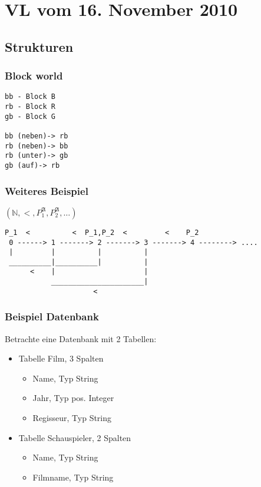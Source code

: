 


\section{VL vom 16. November 2010}

\subsection{Strukturen}
\subsubsection{Block world}

\begin{verbatim}
bb - Block B
rb - Block R
gb - Block G

bb (neben)-> rb
rb (neben)-> bb
rb (unter)-> gb
gb (auf)-> rb
\end{verbatim}

\subsubsection{Weiteres Beispiel}
$(\mathbb{N}, <, P_1^{\mathfrak{A}}, P_2^{\mathfrak{A}}, \dots)$
\begin{verbatim}
P_1  <          <  P_1,P_2  <         <    P_2
 0 ------> 1 -------> 2 -------> 3 -------> 4 --------> ....
 |         |          |          |
 __________|__________|          |
      <    |                     |
           ______________________|
                     <
\end{verbatim}

\subsubsection{Beispiel Datenbank}
Betrachte eine Datenbank mit 2 Tabellen:
\begin{itemize}
\item Tabelle Film, 3 Spalten
\begin{itemize}
\item Name, Typ String
\item Jahr, Typ pos. Integer
\item Regisseur, Typ String
\end{itemize}
\item Tabelle Schauspieler, 2 Spalten
\begin{itemize}
\item Name, Typ String
\item Filmname, Typ String
\end{itemize}
\end{itemize}

